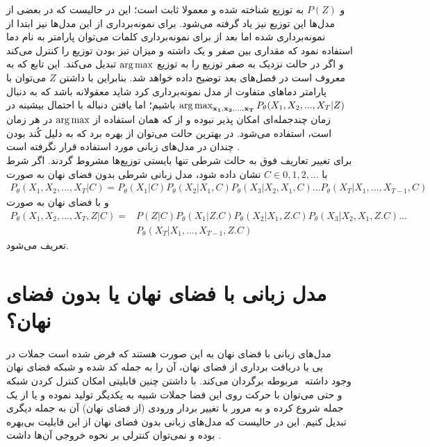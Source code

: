 و $P(Z)$ به توزیع
شناخته شده و معمولا ثابت است؛ این در حالیست که در بعضی از مدل‌ها این توزیع نیز یاد گرفته می‌شود. برای نمونه‌برداری از این مدل‌ها نیز ابتدا از \priordist{} نمونه‌برداری شده اما بعد از برای نمونه‌برداری کلمات می‌توان پارامتر به نام دما استفاده نمود که مقداری بین صفر و یک داشته و میزان تیز بودن توزیع را کنترل می‌کند و اگر در حالت نزدیک به صفر توزیع را به توزیع $\operatorname*{arg\,max}$ تبدیل می‌کند. این تابع که به  معروف است در فصل‌های بعد توضیح داده خواهد شد. بنابراین با داشتن $Z$ می‌توان با پارامتر دما‌های متفاوت از مدل نمونه‌برداری کرد \cite{toward} شاید معقولانه باشد که به دنبال 
$\operatorname*{arg\,max}_{{\bf x_1}, {\bf x_2}, ..., {\bf x_T}} P_\theta(X_1, X_2, ... , X_T|Z)$
باشیم؛ اما یافتن دنباله با احتمال بیشینه در زمان چندجمله‌ای امکان پذیر نبوده و از \greedydecoding{} که همان استفاده از $\operatorname*{arg\,max}$ در هر زمان است، استفاده می‌شود. در بهترین حالت می‌توان از 
بهره برد که به دلیل کُند بودن چندان در مدل‌های زبانی مورد استفاده قرار نگرفته است .
\\
برای تغییر تعاریف فوق به حالت شرطی تنها بایستی توزیع‌ها مشروط گردند. اگر شرط با $C \in {0,1,2,...}$ نشان داده شود، مدل زبانی شرطی بدون فضای نهان به صورت 
\begin{align}
    P_\theta(X_1, X_2, ... , X_T|C) = P_\theta(X_1|C) P_\theta(X_2|X_1,C) P_\theta(X_3|X_2, X_1,C) ... P_\theta(X_T|X_1, ..., X_{T-1},C)
\end{align}
و با فضای نهان به صورت 
\begin{align}
P_\theta(X_1, X_2, ... , X_T,Z|C) =&P(Z|C) P_\theta(X_1|Z.C) P_\theta(X_2|X_1,Z.C) P_\theta(X_3|X_2, X_1,Z.C) ... \nonumber\\& P_\theta(X_T|X_1, ..., X_{T-1},Z.C)
\end{align}
تعریف می‌شود.
\section{مدل زبانی با فضای نهان یا بدون فضای نهان؟} \label{chap1:latent_or_not}
مدل‌های زبانی با فضای نهان به این صورت هستند که فرض شده است جملات در فضای نهان ‎کد شده و شبکه ‎\decoder یی با دریافت برداری از فضای نهان، آن را به جمله مربوطه برگردان می‌کند. با داشتن چنین قابلیتی امکان کنترل کردن شبکه ‎\decoder{}‎ وجود داشته و حتی می‌توان با حرکت روی این فضا جملات شبیه به یکدیگر تولید نموده و یا از یک جمله شروع کرده و به مرور با تغییر بردار ورودی (از فضای نهان) آن به جمله دیگری تبدیل کنیم. این در حالیست که مدل‌های زبانی بدون فضای نهان از این قابلیت بی‌بهره بوده و نمی‌توان کنترلی بر نحوه خروجی آن‌ها داشت \cite{vae_text}.
